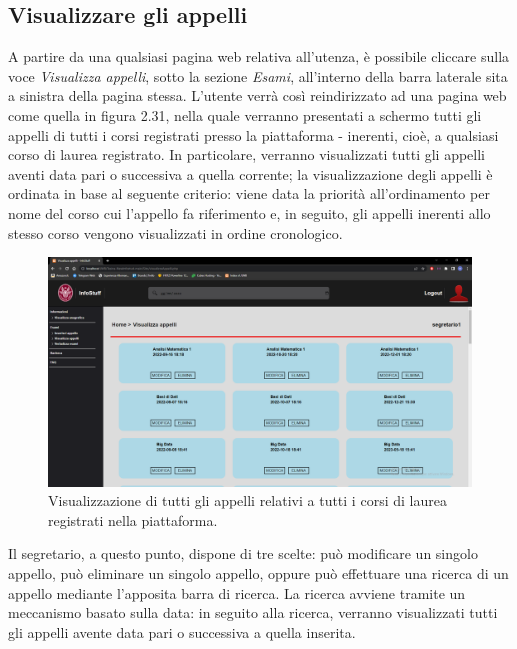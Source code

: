 \documentclass [a4paper,11pt]{book}
\begin{document}
\medskip

\subsection{Visualizzare gli appelli}

A partire da una qualsiasi pagina web relativa all'utenza, è possibile cliccare sulla voce \emph{Visualizza appelli}, sotto la sezione \emph{Esami}, all'interno della barra laterale sita a sinistra della pagina stessa. L'utente verrà così reindirizzato ad una pagina web come quella in figura 2.31, nella quale verranno presentati a schermo tutti gli appelli di tutti i corsi registrati presso la piattaforma - inerenti, cioè, a qualsiasi corso di laurea registrato. In particolare, verranno visualizzati tutti gli appelli aventi data pari o successiva a quella corrente; la visualizzazione degli appelli è ordinata in base al seguente criterio: viene data la priorità all'ordinamento per nome del corso cui l'appello fa riferimento e, in seguito, gli appelli inerenti allo stesso corso vengono visualizzati in ordine cronologico.

\begin{figure}
\centering
\includegraphics[scale=0.3]{figura2-31.png}
\caption{Visualizzazione di tutti gli appelli relativi a tutti i corsi di laurea registrati nella piattaforma.}
\end{figure}

Il segretario, a questo punto, dispone di tre scelte: può modificare un singolo appello, può eliminare un singolo appello, oppure può effettuare una ricerca di un appello mediante l'apposita barra di ricerca. La ricerca avviene tramite un meccanismo basato sulla data: in seguito alla ricerca, verranno visualizzati tutti gli appelli avente data pari o successiva a quella inserita.

\medskip
\end{document}
